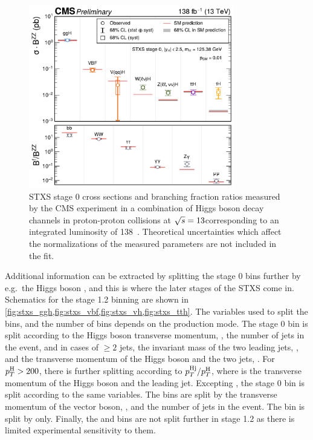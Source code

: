 \begin{figure}[p]
  \centering
  \includegraphics[width=0.8\textwidth]{Figures/Theory/Higgs/HIG-21-018-Figure_005-a.pdf}
  \caption[Measurements of the Stage 0 STXS]{STXS stage 0 cross sections and branching fraction ratios measured by the CMS experiment in a combination of Higgs boson decay channels in proton-proton collisions at $\sqrt{s}=13$\TeV corresponding to an integrated luminosity of 138\fbinv~\cite{CMS-PAS-HIG-21-018}. Theoretical uncertainties which affect the normalizations of the measured parameters are not included in the fit.}\label{fig:stage0_measurement}
\end{figure}

Additional information can be extracted by splitting the stage 0 bins further by e.g.\ the Higgs boson \pt, and this is where the later stages of the STXS come in. Schematics for the stage 1.2 binning are shown in \cref{fig:stxs_ggh,fig:stxs_vbf,fig:stxs_vh,fig:stxs_tth}. The variables used to split the bins, and the number of bins depends on the production mode. The stage 0 \ggH bin is split according to the Higgs boson transverse momentum, \ptH, the number of jets in the event, and in cases of $\geq 2$ jets, the invariant mass of the two leading jets, \mjj, and the transverse momentum of the Higgs boson and the two jets, \ptHjj. For $p_T^\mathrm{H}>200$\GeV, there is further splitting according to $p_T^{\mathrm{H}\mathrm{j}} / p_T^\mathrm{H}$, where \ptHj is the transverse momentum of the Higgs boson and the leading jet. Excepting \ptHj, the stage 0 \qqH bin is split according to the same variables. The \VH bins are split by the transverse momentum of the vector boson, \ptV, and the number of jets in the event. The \ttH bin is split by \ptH only. Finally, the \bbH and \tH bins are not split further in stage 1.2 as there is limited experimental sensitivity to them.

